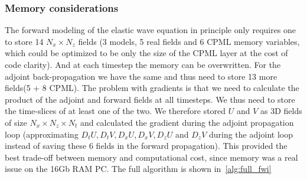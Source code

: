 \documentclass[10pt]{SelfArx} %
\theoremstyle{definition}
\begin{document}
\subsubsection{Memory considerations}
The forward modeling of the elastic wave equation in principle only requires one to store 14 $N_x \times N_z$ fields (3 models, 5 real fields and 6 CPML memory variables, which could be optimized to be only the size of the CPML layer at the cost of code clarity). And at each timestep the memory can be overwritten. For the adjoint back-propagation we have the same and thus need to store 13 more fields(5 + 8 CPML). The problem with gradients is that we need to calculate the product of the adjoint and forward fields at all timesteps. We thus need to store the time-slices of at least one of the two. We therefore stored $U$ and $V$ as 3D fields of size $N_x \times N_z \times N_t$ and calculated the gradient during the adjoint propagation loop (approximating $D_t U, D_t V, D_xU, D_xV, D_zU$ and $D_z V$ during the adjoint loop instead of saving these 6 fields in the forward propagation). This provided the best trade-off between memory and computational cost, since memory was a real issue on the 16Gb RAM PC. The full algorithm is shown in~\cref{alg:full_fwi}
\end{document}
